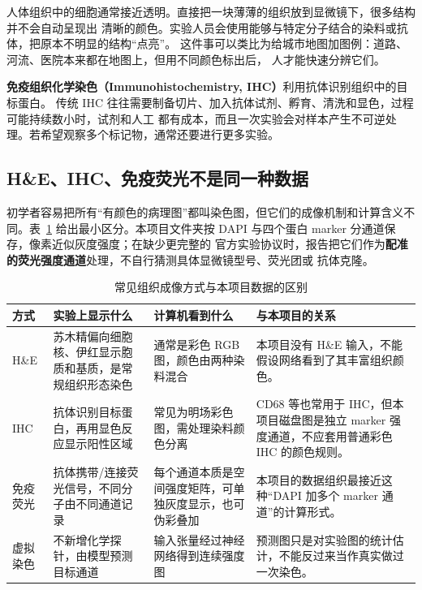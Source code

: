 \documentclass[12pt,a4paper,UTF8]{ctexart}
\newcommand{\term}[2]{\textbf{#1（#2）}}
\begin{document}
人体组织中的细胞通常接近透明。直接把一块薄薄的组织放到显微镜下，很多结构并不会自动呈现出
清晰的颜色。实验人员会使用能够与特定分子结合的染料或抗体，把原本不明显的结构“点亮”。
这件事可以类比为给城市地图加图例：道路、河流、医院本来都在地图上，但用不同颜色标出后，
人才能快速分辨它们。

\term{免疫组织化学染色}{Immunohistochemistry, IHC}利用抗体识别组织中的目标蛋白。
传统 IHC 往往需要制备切片、加入抗体试剂、孵育、清洗和显色，过程可能持续数小时，试剂和人工
都有成本，而且一次实验会对样本产生不可逆处理。若希望观察多个标记物，通常还要进行更多实验。

\subsection{H\&E、IHC、免疫荧光不是同一种数据}

初学者容易把所有“有颜色的病理图”都叫染色图，但它们的成像机制和计算含义不同。表~\ref{tab:stain-types}
给出最小区分。本项目文件夹按 DAPI 与四个蛋白 marker 分通道保存，像素近似灰度强度；在缺少更完整的
官方实验协议时，报告把它们作为\textbf{配准的荧光强度通道}处理，不自行猜测具体显微镜型号、荧光团或
抗体克隆。

\begin{table}[H]
\centering
\caption{常见组织成像方式与本项目数据的区别}
\label{tab:stain-types}
\begin{tabularx}{\textwidth}{>{\raggedright\arraybackslash}p{}
                              >{\raggedright\arraybackslash}p{}
                              >{\raggedright\arraybackslash}p{}X}
\toprule
方式 & 实验上显示什么 & 计算机看到什么 & 与本项目的关系 \\
\midrule
H\&E & 苏木精偏向细胞核、伊红显示胞质和基质，是常规组织形态染色 & 通常是彩色 RGB 图，颜色由两种染料混合 & 本项目没有 H\&E 输入，不能假设网络看到了其丰富组织颜色。\\
IHC & 抗体识别目标蛋白，再用显色反应显示阳性区域 & 常见为明场彩色图，需处理染料颜色分离 & CD68 等也常用于 IHC，但本项目磁盘图是独立 marker 强度通道，不应套用普通彩色 IHC 的颜色规则。\\
免疫荧光 & 抗体携带/连接荧光信号，不同分子由不同通道记录 & 每个通道本质是空间强度矩阵，可单独灰度显示，也可伪彩叠加 & 本项目的数据组织最接近这种“DAPI 加多个 marker 通道”的计算形式。\\
虚拟染色 & 不新增化学探针，由模型预测目标通道 & 输入张量经过神经网络得到连续强度图 & 预测图只是对实验图的统计估计，不能反过来当作真实做过一次染色。\\
\bottomrule
\end{tabularx}
\end{table}
\end{document}
